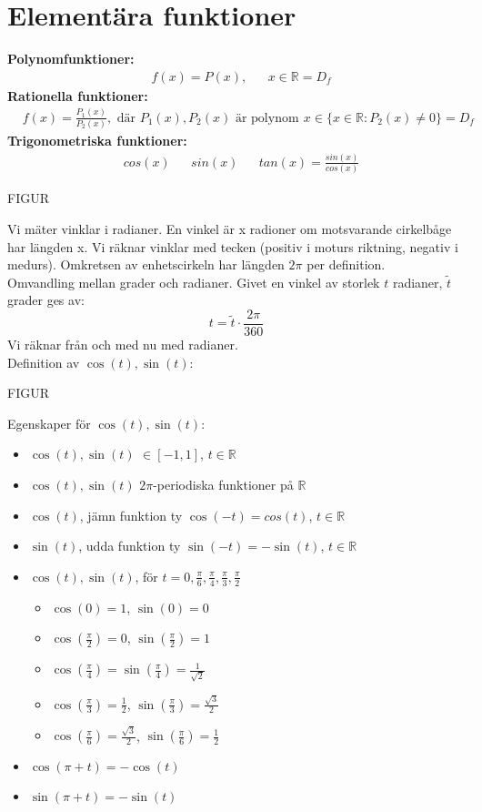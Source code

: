 \section{Elementära funktioner} %
\label{sub:element_ra_funktioner}
\textbf{Polynomfunktioner:}
\begin{align*}
	&f(x) = P(x), &&x \in \mathbb{R} = D_f
\end{align*}
\textbf{Rationella funktioner:}
\begin{align*}
	&f(x) = \frac{P_1(x)}{P_2(x)}, \mbox{ där } P_1(x), P_2(x) \mbox{ är polynom} &&x \in \{x \in \mathbb{R}: P_2(x) \neq 0\} = D_f
\end{align*}
\textbf{Trigonometriska funktioner:}
\begin{align*}
	&cos(x) &&sin(x) &&tan(x) = \frac{sin(x)}{cos(x)}
\end{align*}
\begin{center}
	FIGUR	
\end{center}
Vi mäter vinklar i radianer. En vinkel är x radioner om motsvarande cirkelbåge har längden x. Vi räknar vinklar med tecken (positiv i moturs riktning, negativ i medurs). Omkretsen av enhetscirkeln har längden $2\pi$ per definition.\\
Omvandling mellan grader och radianer. Givet en vinkel av storlek $t$ radianer, $\tilde{t}$ grader ges av:
\[
t = \tilde{t} \cdot \frac{2\pi}{360}
\]
Vi räknar från och med nu med radianer.\\
Definition av $\cos(t), \sin(t)$:
\begin{center}
	FIGUR
\end{center}
Egenskaper för $\cos(t), \sin(t)$:
\begin{itemize}
	\item $\cos(t), \sin(t)$ $\in[-1, 1]$, $t \in \mathbb{R}$
	\item $\cos(t), \sin(t)$ $2\pi$-periodiska funktioner på $\mathbb{R}$
	\item $\cos(t)$, jämn funktion ty $\cos(-t) = cos(t)$, $t \in \mathbb{R}$
	\item $\sin(t)$, udda funktion ty $\sin(-t) = -\sin(t)$, $t \in \mathbb{R}$
	\item $\cos(t), \sin(t)$, för $t = 0, \frac{\pi}{6}, \frac{\pi}{4}, \frac{\pi}{3}, \frac{\pi}{2}$
	\begin{itemize}
		\item $\cos(0) = 1$, $\sin(0) = 0$
		\item $\cos(\frac{\pi}{2}) = 0$, $\sin(\frac{\pi}{2}) = 1$
		\item $\cos(\frac{\pi}{4}) = \sin(\frac{\pi}{4}) = \frac{1}{\sqrt{2}}$
		\item $\cos(\frac{\pi}{3}) = \frac{1}{2}$, $\sin(\frac{\pi}{3}) = \frac{\sqrt{3}}{2}$
		\item $\cos(\frac{\pi}{6}) = \frac{\sqrt{3}}{2}$, $\sin(\frac{\pi}{6}) = \frac{1}{2}$
	\end{itemize}
	\item $\cos(\pi + t) = - \cos(t)$
	\item $\sin(\pi + t) = - \sin(t)$
\end{itemize}
